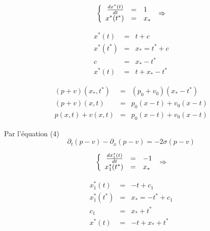 \documentclass[a4paper,11pt]{article}
\begin{document}
\begin{equation*}
\left\{
\begin{array}{rcl}
    \frac{dx^{*}(t)}{dt} &=& 1 \\
    x^{*}(t^{*}) &=& x_{*}
\end{array}
\right. \\
\Rightarrow
\end{equation*}

\begin{equation*}
\begin{array}{rcl}
x^{*}(t) &=& t +c \\
x^{*}(t^{*}) &=& x_{*} = t^{*}+c \\
c &=& x_{*}-t^{*} \\
x^{*}(t) &=& t + x_{*}-t^{*}
\end{array}
\end{equation*}

\begin{equation*}
\begin{array}{rcl}
    (p+v)(x_{*},t^{*}) &=& (p_{0}+v_{0})(x_{*}-t^{*}) \\
    (p+v)(x,t) &=& p_{0}(x-t) + v_{0}(x-t) \\
    p(x,t) + v(x,t) &=& p_{0}(x-t) + v_{0}(x-t)
\end{array}
\end{equation*}

Par l'équation (4)
\begin{equation*}
\partial_{t}(p-v) - \partial_{x}(p-v) = -2\sigma(p-v)
\end{equation*}

\begin{equation*}
\left\{
\begin{array}{rcl}
    \frac{dx_{1}^{*}(t)}{dt} &=& -1 \\
    x_{1}^{*}(t^{*}) &=& x_{*}
\end{array}
\right. \\
\Rightarrow
\end{equation*}

\begin{equation*}
\begin{array}{rcl}
    x_{1}^{*}(t) &=& -t +c_{1} \\
    x_{1}^{*}(t^{*}) &=& x_{*} = -t^{*}+c_{1} \\
    c_{1} &=& x_{*} + t^{*} \\
    x^{*}(t) &=& -t + x_{*} + t^{*}
\end{array}
\end{equation*}
\end{document}
